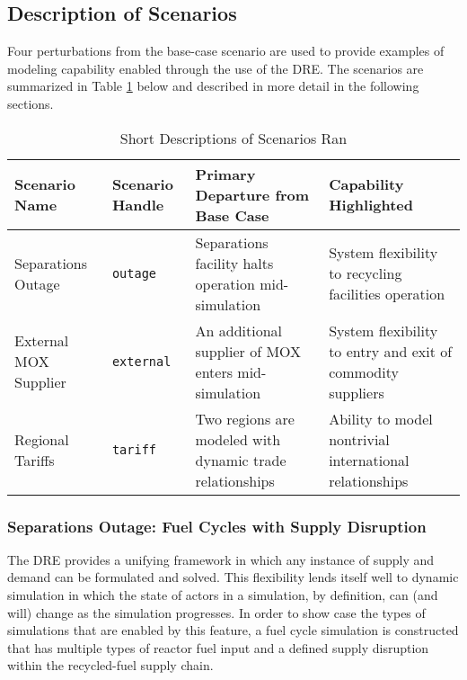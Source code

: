 \subsection{Description of Scenarios}

Four perturbations from the base-case scenario are used to provide examples of
modeling capability enabled through the use of the DRE. The scenarios are
summarized in Table \ref{scenarios} below and described in more detail in the
following sections.

\begin{table}[]
\centering
\caption{Short Descriptions of Scenarios Ran}
\label{scenarios}
\begin{tabularx}{\textwidth}{|p{1.5cm}|p{1.5cm}|X|X|}
\hline
\textbf{Scenario  Name} & \textbf{Scenario Handle} & \textbf{Primary Departure from Base Case}                & \textbf{Capability Highlighted}                             \\ \hline
Separations Outage      & \texttt{outage}                   & Separations facility halts operation mid-simulation      & System flexibility to recycling facilities operation        \\ \hline
External MOX Supplier   & \texttt{external}                 & An additional supplier of MOX enters mid-simulation      & System flexibility to entry and exit of commodity suppliers \\ \hline
Regional Tariffs        & \texttt{tariff}                   & Two regions are modeled with dynamic trade relationships & Ability to model nontrivial international relationships     \\ \hline
\end{tabularx}
\end{table}

\subsubsection{Separations Outage: Fuel Cycles with Supply Disruption}

The DRE provides a unifying framework in which any instance of supply and demand
can be formulated and solved. This flexibility lends itself well to dynamic
simulation in which the state of actors in a simulation, by definition, can (and
will) change as the simulation progresses. In order to show case the types of
simulations that are enabled by this feature, a fuel cycle simulation is
constructed that has multiple types of reactor fuel input and a defined supply
disruption within the recycled-fuel supply chain. 

